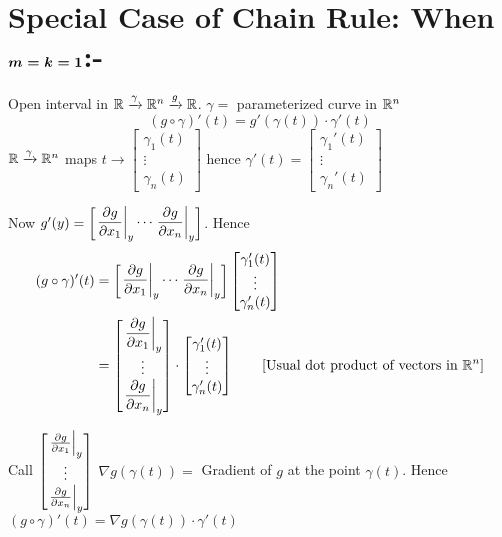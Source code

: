 \section{Special Case of Chain Rule: When $\boldsymbol{m=k=1}$:-}
Open interval in $\mathbb{R}\xrightarrow{\gamma}\mathbb{R}^n\xrightarrow{g}\mathbb{R}$. $\gamma=$ parameterized curve in $\mathbb{R}^n$
$$(g\circ \gamma)'(t)=g'(\gamma(t))\cdot \gamma'(t)$$ ${\mathbb{R}\xrightarrow{\gamma}\mathbb{R}^n}$ maps $t\to\begin{bmatrix}\gamma_1(t)\\ \vdots\\ \gamma_n(t)	\end{bmatrix}$ hence $\gamma'(t)=\begin{bmatrix}
	\gamma_1'(t)\\ \vdots\\ \gamma_n'(t)
\end{bmatrix}$

Now $g'(y)=\begin{bmatrix}
	\left.\dfrac{\partial g}{\partial x_1}\right|_y\cdots \left.\dfrac{\partial g}{\partial x_n}\right|_y
\end{bmatrix}$. Hence \begin{align*}
(g\circ \gamma)'(t) & = \begin{bmatrix}
	\left.\dfrac{\partial g}{\partial x_1}\right|_y\cdots \left.\dfrac{\partial g}{\partial x_n}\right|_y
\end{bmatrix}\begin{bmatrix}
\gamma_1'(t)\\ \vdots\\ \gamma_n'(t)
\end{bmatrix}\\
& = \begin{bmatrix}
	\left.\dfrac{\partial g}{\partial x_1}\right|_y \\ \vdots \\ \left.\dfrac{\partial g}{\partial x_n}\right|_y
\end{bmatrix}\cdot \begin{bmatrix}
	\gamma_1'(t)\\ \vdots\\ \gamma_n'(t)
\end{bmatrix}\qquad[\text{Usual dot product of vectors in }\mathbb{R}^n] \\
\end{align*}
\pagebreak

Call $\begin{bmatrix}
\left.\frac{\partial g}{\partial x_1}\right|_y \\ \vdots \\ \left.\frac{\partial g}{\partial x_n}\right|_y
\end{bmatrix}$ $\nabla g(\gamma(t))=$ Gradient of $g$ at the point $\gamma(t)$. Hence $(g\circ\gamma)'(t)=\nabla g(\gamma(t))\cdot\gamma'(t)$


